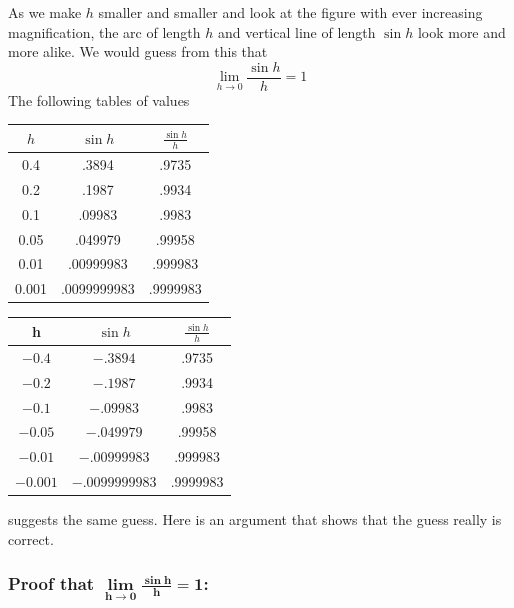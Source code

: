 \noindent
As we make $h$ smaller and smaller and look at the figure with ever increasing
magnification, the arc of length $h$ and vertical line of length $\sin h$
look more and more alike. We would guess from this that
\begin{equation*}
\lim_{h\rightarrow 0}\frac{\sin h}{h}=1
\end{equation*}
The following tables of values
\renewcommand{\arraystretch}{1.1}
\begin{center}
     \begin{tabular}{|c|c|c|}
          \hline
          $h$ &     $\sin h$ &     $\tfrac{\sin h}{h}$ \\ \hline
          0.4 &      .3894 &          .9735 \\
          0.2 &      .1987 &          .9934  \\
          0.1 &      .09983 &         .9983  \\
          0.05 &     .049979 &        .99958  \\
          0.01 &     .00999983 &      .999983  \\
          0.001 &    .0099999983 &    .9999983  \\ \hline
     \end{tabular}
     \qquad\qquad
     \begin{tabular}{|c|c|c|}
          \hline
           h  &     $\sin h$ &     $\tfrac{\sin h}{h}$ \\ \hline
          $-0.4$ &      $-.3894$ &          .9735 \\
          $-0.2$ &      $-.1987$ &          .9934  \\
          $-0.1$ &      $-.09983$ &         .9983  \\
          $-0.05$ &     $-.049979$ &        .99958  \\
          $-0.01$ &     $-.00999983$ &      .999983  \\
          $-0.001$ &    $-.0099999983$ &    .9999983  \\ \hline
     \end{tabular}

\end{center}
\renewcommand{\arraystretch}{1.0}
suggests the same guess. Here is an argument that shows that the guess
really is correct.

\subsubsection{Proof that $\mathbf{\lim\limits_{h\rightarrow 0}\tfrac{\sin h}{h}=1}$:}

